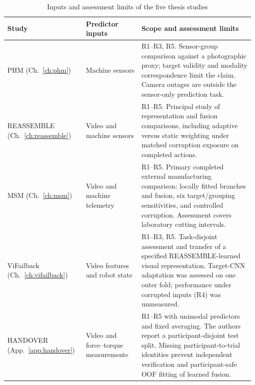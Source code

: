 \begin{table}[htbp]
  \centering
  \caption{Inputs and assessment limits of the five thesis studies}
  \label{tab:fusion-study-scope}
  \begingroup
  \singlespacing\small
  \setlength{\tabcolsep}{4pt}
  \renewcommand{\arraystretch}{1.28}
  \begin{tabularx}{\linewidth}{@{}P{.22\linewidth} P{.23\linewidth} Y@{}}
    \toprule
    Study & Predictor inputs & Scope and assessment limits\\
    \midrule
    PHM (Ch.~\ref{ch:phm})
      & Machine sensors
      & R1--R3, R5. Sensor-group comparison against a photographic proxy;
        target validity and modality correspondence limit the claim.
        Camera outages are outside the sensor-only prediction task.\\
    REASSEMBLE (Ch.~\ref{ch:reassemble})
      & Video and machine sensors
      & R1--R5. Principal study of representation and fusion comparisons,
        including adaptive versus static weighting under matched corruption
        exposure on completed actions.\\
    MSM (Ch.~\ref{ch:msm})
      & Video and machine telemetry
      & R1--R5. Primary completed external manufacturing comparison:
        locally fitted branches and fusion, six target/grouping sensitivities,
        and controlled corruption. Assessment covers laboratory cutting intervals.\\
    ViFailback (Ch.~\ref{ch:vifailback})
      & Video features and robot state
      & R1--R3, R5. Task-disjoint assessment and transfer of a specified
        REASSEMBLE-learned visual representation. Target-CNN adaptation was
        assessed on one outer fold; performance under corrupted inputs (R4) was
        unmeasured.\\
    HANDOVER (App.~\ref{app:handover})
      & Video and force--torque measurements
      & R1--R5 with unimodal predictors and fixed averaging. The authors report
        a participant-disjoint test split. Missing participant-to-trial identities
        prevent independent verification and participant-safe OOF fitting of
        learned fusion.\\
    \bottomrule
  \end{tabularx}
  \endgroup
\end{table}

